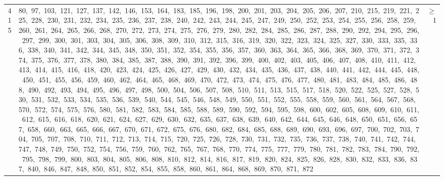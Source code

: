\begin{longtable}{c|p{}|r}
415 & 80,\ 97,\ 103,\ 121,\ 127,\ 137,\ 142,\ 146,\ 153,\ 164,\ 183,\ 185,\ 196,\ 198,\ 200,\ 201,\ 203,\ 204,\ 205,\ 206,\ 207,\ 210,\ 215,\ 219,\ 221,\ 225,\ 228,\ 230,\ 231,\ 232,\ 234,\ 235,\ 236,\ 237,\ 238,\ 240,\ 242,\ 243,\ 244,\ 245,\ 247,\ 249,\ 250,\ 252,\ 253,\ 254,\ 255,\ 256,\ 258,\ 259,\ 260,\ 261,\ 264,\ 265,\ 266,\ 268,\ 270,\ 272,\ 273,\ 274,\ 275,\ 276,\ 279,\ 280,\ 282,\ 284,\ 285,\ 286,\ 287,\ 288,\ 290,\ 292,\ 294,\ 295,\ 296,\ 297,\ 299,\ 300,\ 301,\ 303,\ 304,\ 305,\ 306,\ 308,\ 309,\ 310,\ 312,\ 315,\ 316,\ 319,\ 320,\ 322,\ 323,\ 324,\ 325,\ 327,\ 330,\ 333,\ 335,\ 336,\ 338,\ 340,\ 341,\ 342,\ 344,\ 345,\ 348,\ 350,\ 351,\ 352,\ 354,\ 355,\ 356,\ 357,\ 360,\ 363,\ 364,\ 365,\ 366,\ 368,\ 369,\ 370,\ 371,\ 372,\ 374,\ 375,\ 376,\ 377,\ 378,\ 380,\ 384,\ 385,\ 387,\ 388,\ 390,\ 391,\ 392,\ 396,\ 399,\ 400,\ 402,\ 403,\ 405,\ 406,\ 407,\ 408,\ 410,\ 411,\ 412,\ 413,\ 414,\ 415,\ 416,\ 418,\ 420,\ 423,\ 424,\ 425,\ 426,\ 427,\ 429,\ 430,\ 432,\ 434,\ 435,\ 436,\ 437,\ 438,\ 440,\ 441,\ 442,\ 444,\ 445,\ 448,\ 450,\ 451,\ 455,\ 456,\ 459,\ 460,\ 462,\ 464,\ 465,\ 468,\ 469,\ 470,\ 472,\ 473,\ 474,\ 475,\ 476,\ 477,\ 480,\ 481,\ 483,\ 484,\ 485,\ 486,\ 488,\ 490,\ 492,\ 493,\ 494,\ 495,\ 496,\ 497,\ 498,\ 500,\ 504,\ 506,\ 507,\ 508,\ 510,\ 511,\ 513,\ 515,\ 517,\ 518,\ 520,\ 522,\ 525,\ 527,\ 528,\ 530,\ 531,\ 532,\ 533,\ 534,\ 535,\ 536,\ 539,\ 540,\ 544,\ 545,\ 546,\ 548,\ 549,\ 550,\ 551,\ 552,\ 555,\ 558,\ 559,\ 560,\ 561,\ 564,\ 567,\ 568,\ 570,\ 572,\ 574,\ 575,\ 576,\ 580,\ 581,\ 582,\ 583,\ 584,\ 585,\ 588,\ 589,\ 590,\ 592,\ 594,\ 595,\ 598,\ 600,\ 602,\ 605,\ 608,\ 609,\ 610,\ 611,\ 612,\ 615,\ 616,\ 618,\ 620,\ 621,\ 624,\ 627,\ 629,\ 630,\ 632,\ 635,\ 637,\ 638,\ 639,\ 640,\ 642,\ 644,\ 645,\ 646,\ 648,\ 650,\ 651,\ 656,\ 657,\ 658,\ 660,\ 663,\ 665,\ 666,\ 667,\ 670,\ 671,\ 672,\ 675,\ 676,\ 680,\ 682,\ 684,\ 685,\ 688,\ 689,\ 690,\ 693,\ 696,\ 697,\ 700,\ 702,\ 703,\ 704,\ 705,\ 707,\ 708,\ 710,\ 711,\ 712,\ 713,\ 714,\ 715,\ 720,\ 725,\ 726,\ 728,\ 730,\ 731,\ 732,\ 735,\ 736,\ 737,\ 738,\ 740,\ 741,\ 742,\ 744,\ 747,\ 748,\ 749,\ 750,\ 752,\ 754,\ 756,\ 759,\ 760,\ 762,\ 765,\ 767,\ 768,\ 770,\ 774,\ 775,\ 777,\ 779,\ 780,\ 781,\ 782,\ 783,\ 784,\ 790,\ 792,\ 795,\ 798,\ 799,\ 800,\ 803,\ 804,\ 805,\ 806,\ 808,\ 810,\ 812,\ 814,\ 816,\ 817,\ 819,\ 820,\ 824,\ 825,\ 826,\ 828,\ 830,\ 832,\ 833,\ 836,\ 837,\ 840,\ 846,\ 847,\ 848,\ 850,\ 851,\ 852,\ 854,\ 855,\ 858,\ 860,\ 861,\ 864,\ 868,\ 869,\ 870,\ 871,\ 872 & $\ge$ 1 \\

\end{longtable}

